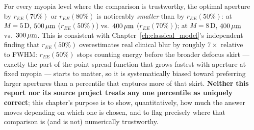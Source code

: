 For every myopia level where the comparison is trustworthy, the optimal aperture by
$r_{EE}(70\%)$ or $r_{EE}(80\%)$ is noticeably \emph{smaller} than by $r_{EE}(50\%)$:
at $M=5\,$D, $500\,\mu\text{m}$ ($r_{EE}(50\%)$) vs.\ $400\,\mu\text{m}$ ($r_{EE}(70\%)$); at $M=8\,$D,
$400\,\mu\text{m}$ vs.\ $300\,\mu\text{m}$. This is consistent with Chapter~\ref{ch:classical_model}'s
independent finding that $r_{EE}(50\%)$ overestimates real clinical blur by roughly
$7\times$ relative to FWHM: $r_{EE}(50\%)$ stops counting energy before the broader
defocus skirt --- exactly the part of the point-spread function that grows fastest
with aperture at fixed myopia --- starts to matter, so it is systematically biased
toward preferring larger apertures than a percentile that captures more of that skirt.
\textbf{Neither this report nor its source project treats any one percentile as
uniquely correct}; this chapter's purpose is to show, quantitatively, how much the
answer moves depending on which one is chosen, and to flag precisely where that
comparison is (and is not) numerically trustworthy.
